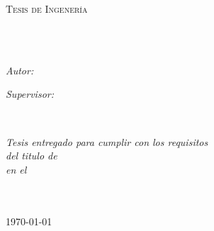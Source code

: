 \documentclass[
11pt, %
spanish, %
singlespacing, %
headsepline, %
]{MastersDoctoralThesis} %
\author{Nicholas \textsc{Spalding Earley-Dolenc}} %
\begin{document}
\frontmatter %

\pagestyle{plain} %


\begin{titlepage}
\begin{center}

\vspace*{.06\textheight}
{\scshape\LARGE \univname\par}\vspace{1.5cm} %
\textsc{\Large Tesis de Ingenería}\\[0.5cm] %

\HRule \\[0.4cm] %
{\huge \bfseries \ttitle\par}\vspace{0.4cm} %
\HRule \\[1.5cm] %
 
\begin{minipage}[t]{0.4\textwidth}
\begin{flushleft} \large
\emph{Autor:}\\
\href{https://github.com/nishedcob}{\authorname} %
\end{flushleft}
\end{minipage}
\begin{minipage}[t]{0.4\textwidth}
\begin{flushright} \large
\emph{Supervisor:} \\
\href{https://github.com/nishedcob}{\supname} %
\end{flushright}
\end{minipage}\\[3cm]
 
\vfill

\large \textit{Tesis entregado para cumplir con los requisitos\\ del titulo de \degreename}\\[0.3cm] %
\textit{en el}\\[0.4cm]
\groupname\\\deptname\\[2cm] %
 
\vfill

{\large \today}\\[4cm] %
 
\vfill
\end{center}
\end{titlepage}
\end{document}
